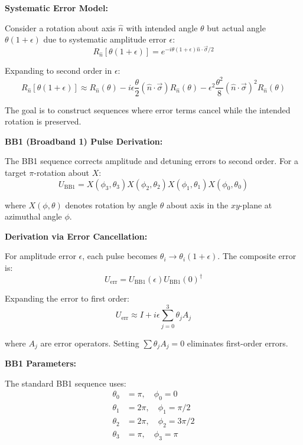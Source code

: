 \documentclass[11pt,a4paper]{article}
\theoremstyle{definition}
\theoremstyle{remark}
\begin{document}
\textbf{Systematic Error Model:}

Consider a rotation about axis $\hat{n}$ with intended angle $\theta$ but actual angle $\theta(1+\epsilon)$ due to systematic amplitude error $\epsilon$:
\begin{equation}
R_{\hat{n}}[\theta(1+\epsilon)] = e^{-i\theta(1+\epsilon)\hat{n}\cdot\vec{\sigma}/2}
\end{equation}

Expanding to second order in $\epsilon$:
\begin{equation}
R_{\hat{n}}[\theta(1+\epsilon)] \approx R_{\hat{n}}(\theta) - i\epsilon\frac{\theta}{2}(\hat{n}\cdot\vec{\sigma})R_{\hat{n}}(\theta) - \epsilon^2\frac{\theta^2}{8}(\hat{n}\cdot\vec{\sigma})^2 R_{\hat{n}}(\theta)
\end{equation}

The goal is to construct sequences where error terms cancel while the intended rotation is preserved.

\textbf{BB1 (Broadband 1) Pulse Derivation:}

The BB1 sequence corrects amplitude and detuning errors to second order. For a target $\pi$-rotation about $X$:
\begin{equation}
U_{\text{BB1}} = X(\phi_3, \theta_3) X(\phi_2, \theta_2) X(\phi_1, \theta_1) X(\phi_0, \theta_0)
\end{equation}

where $X(\phi, \theta)$ denotes rotation by angle $\theta$ about axis in the $xy$-plane at azimuthal angle $\phi$.

\textbf{Derivation via Error Cancellation:}

For amplitude error $\epsilon$, each pulse becomes $\theta_i \rightarrow \theta_i(1+\epsilon)$. The composite error is:
\begin{equation}
U_{\text{err}} = U_{\text{BB1}}(\epsilon) U_{\text{BB1}}(0)^\dagger
\end{equation}

Expanding the error to first order:
\begin{equation}
U_{\text{err}} \approx I + i\epsilon \sum_{j=0}^3 \theta_j A_j
\end{equation}

where $A_j$ are error operators. Setting $\sum \theta_j A_j = 0$ eliminates first-order errors.

\textbf{BB1 Parameters:}

The standard BB1 sequence uses:
\begin{align}
\theta_0 &= \pi, \quad \phi_0 = 0 \\
\theta_1 &= 2\pi, \quad \phi_1 = \pi/2 \\
\theta_2 &= 2\pi, \quad \phi_2 = 3\pi/2 \\
\theta_3 &= \pi, \quad \phi_3 = \pi
\end{align}
\end{document}
